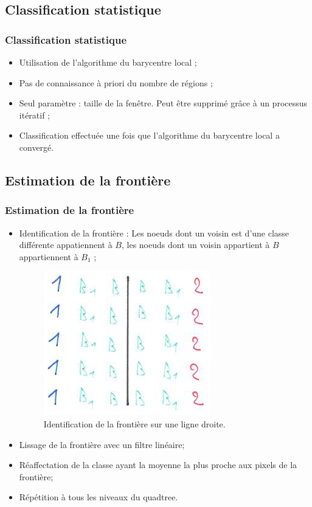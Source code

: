 \documentclass[handout]{beamer}
\begin{document}
		\subsection{Classification statistique}
		\begin{frame}
			\frametitle{Classification statistique}
				\begin{itemize}
					\item Utilisation de l'algorithme du barycentre local ;
					\item Pas de connaissance à priori du nombre de régions ;
					\item Seul paramètre : taille de la fenêtre. Peut être supprimé grâce à un processus itératif ;
					\item Classification effectuée une fois que l’algorithme du barycentre local a convergé.
				\end{itemize}		
		\end{frame}

		\subsection{Estimation de la frontière}
		\begin{frame}
			\frametitle{Estimation de la frontière}
				\begin{itemize}
					\item Identification de la frontière : Les noeuds dont un voisin est d'une classe différente appatiennent à $B$, les noeuds dont un voisin appartient à $B$ appartiennent à $B_1$ ;
					\begin{figure}[H]
						\centering
						\includegraphics[scale=0.19]{images/bordure-3.jpg}
						\caption{Identification de la frontière sur une ligne droite.}
						\label{fig:quadtree2}
					\end{figure}
					\item Lissage de la frontière avec un filtre linéaire;
					\item Réaffectation de la classe ayant la moyenne la plus proche aux pixels de la frontière;
					\item Répétition à tous les niveaux du quadtree.
				\end{itemize}		
		\end{frame}
\end{document}
